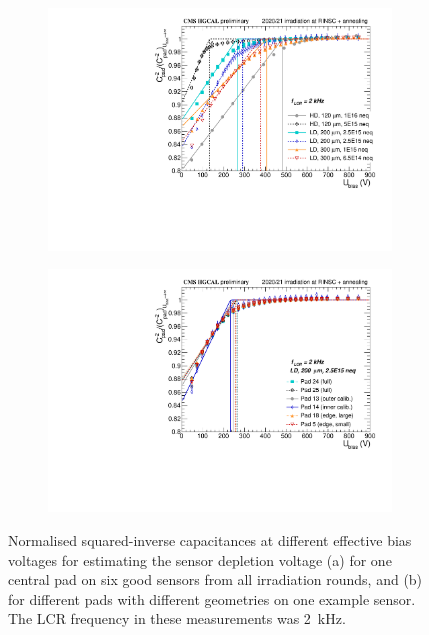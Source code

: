 \begin{figure}
	\captionsetup[subfigure]{aboveskip=-1pt,belowskip=-1pt}
	\centering
	\begin{subfigure}[b]{0.49\textwidth}
		\includegraphics[width=0.999\textwidth]{plots/channel_cv/channel_invCV_sensors_sensors.pdf}
		\subcaption{
		}
		\label{plot:pad_invCV_sensor}
	\end{subfigure}
	\hfill
	\begin{subfigure}[b]{0.49\textwidth}
		\includegraphics[width=0.999\textwidth]{plots/channel_cv/channel_invCV_sensors_channels.pdf}
		\subcaption{
		}
		\label{plot:pad_invCV_channels}
	\end{subfigure}
	\caption{
		Normalised squared-inverse capacitances at different effective bias voltages for estimating the sensor depletion voltage (a) for one central pad on six good sensors from all irradiation rounds, and (b) for different pads with different geometries on one example sensor.
		The LCR frequency in these measurements was \SI{2}{\kilo\hertz}.
	}
\end{figure}


